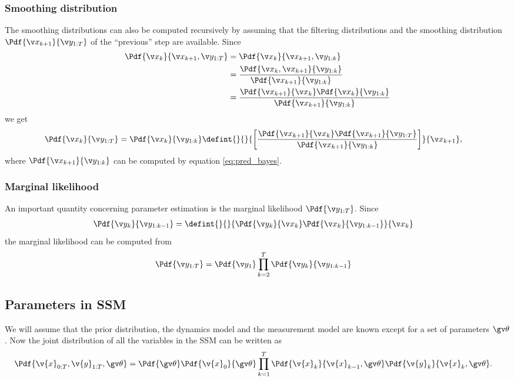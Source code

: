 \subsubsection*{Smoothing distribution}
The smoothing distributions can also be computed recursively by assuming that the filtering distributions
and the smoothing distribution $\Pdf{\x_{k+1}}{\y_{1:T}}$ of the ``previous'' step are available.
Since
\begin{align*}
	\Pdf{\xk}{\x_{k+1},\y_{1:T}}&=\Pdf{\xk}{\x_{k+1},\y_{1:k}}\\
	&=\frac{\Pdf{\xk,\x_{k+1}}{\y_{1:k}}}{\Pdf{\x_{k+1}}{\y_{1:k}}}\\
	&=\frac{\Pdf{\x_{k+1}}{\xk}\Pdf{\xk}{\y_{1:k}}}{\Pdf{\x_{k+1}}{\y_{1:k}}}
\end{align*}
we get
\begin{align}
	\Pdf{\xk}{\y_{1:T}}&=\Pdf{\xk}{\y_{1:k}}\defint{}{}{\left[\frac{\Pdf{\x_{k+1}}{\xk}\Pdf{\x_{k+1}}{\y_{1:T}}}{\Pdf{\x_{k+1}}{\y_{1:k}}}\right]}{\x_{k+1}},
\end{align}
where $\Pdf{\x_{k+1}}{\y_{1:k}}$ can be computed by equation \eqref{eq:pred_bayes}.

\subsubsection*{Marginal likelihood}

An important quantity concerning parameter estimation is the marginal likelihood $\Pdf{\y_{1:T}}$. Since
\begin{align}
	\Pdf{\y_k}{\y_{1:k-1}}&=\defint{}{}{\Pdf{\yk}{\xk}\Pdf{\xk}{\y_{1:k-1}}}{\xk}
\end{align}
the marginal likelihood can be computed from
\begin{align}
	\Pdf{\y_{1:T}}&=\Pdf{\y_1}\prod_{k=2}^T \Pdf{\y_k}{\y_{1:k-1}}
\end{align}

\subsection{Parameters in SSM}

We will assume that the prior distribution, the dynamics model and the measurement model are known
except for a set of parameters $\Th$. Now the joint
distribution of all the variables in the SSM can be written as
\begin{align}
	\Pdf{\v{x}_{0:T},\v{y}_{1:T},\Th}&=\Pdf{\Th}\Pdf{\v{x}_0}{\Th}\prod_{k=1}^T\Pdf{\v{x}_k}{\v{x}_{k-1},\Th}\Pdf{\v{y}_k}{\v{x}_{k},\Th}.
\end{align}

